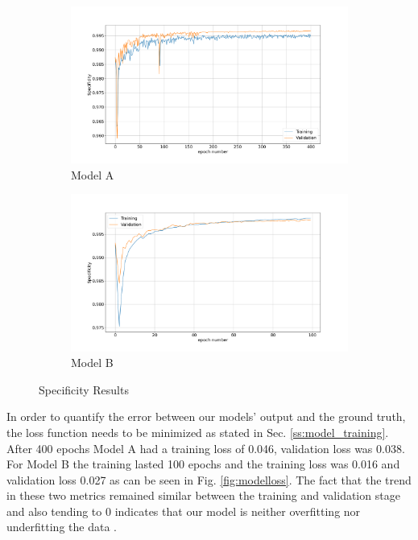 \documentclass[12pt,a4paper]{scrartcl}
\begin{document}
\begin{figure}[H]
\centering
\begin{subfigure}{1\textwidth}
  \centering
  \includegraphics[width=\linewidth]{./results/model_a_specificity.png}
  \caption{Model A}
  \label{fig:model_a_specificity}
\end{subfigure}
\begin{subfigure}{1\textwidth}
  \centering
  \includegraphics[width=\linewidth]{./results/model_b_specificity.png}
  \caption{Model B}
  \label{fig:modelb_specificity}
\end{subfigure}
\caption{Specificity Results}
\label{fig:specificity_results}
\end{figure}


In order to quantify the error between our models' output and the ground truth, the loss function needs to be minimized as stated in Sec. \ref{ss:model_training}. After 400 epochs Model A had a training loss of 0.046, validation loss was 0.038. For Model B the training lasted 100 epochs and the training loss was 0.016 and validation loss 0.027 as can be seen in Fig. \ref{fig:modelloss}. The fact that the trend in these two metrics remained similar between the training and validation stage and also tending to 0 indicates that our model is neither overfitting nor underfitting the data \cite{DIDLBook}. 
\end{document}
